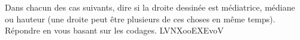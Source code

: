 
\begin{exercice}\label{exosmath-0918}

    Dans chacun des cas suivants, dire si la droite dessinée est médiatrice, médiane ou hauteur (une droite peut être plusieurs de ces choses en même temps). Répondre en vous basant sur les codages.
    LVNXooEXEvoV


\end{exercice}

